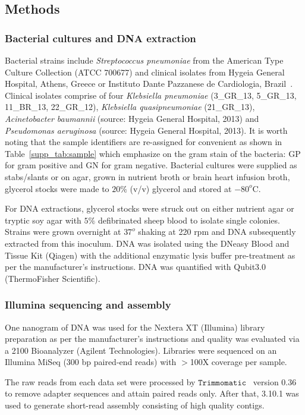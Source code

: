 \subsection{Methods}
\subsubsection{Bacterial cultures and DNA extraction}
Bacterial strains include \emph{Streptococcus pneumoniae} from the American Type Culture Collection (ATCC 700677) and clinical isolates from Hygeia General Hospital, Athens, Greece or Instituto Dante Pazzanese de Cardiologia, Brazil~\cite{Miranda2018}. Clinical isolates comprise of four \emph{Klebsiella pneumoniae} (3\_GR\_13, 5\_GR\_13, 11\_BR\_13, 22\_GR\_12), \emph{Klebsiella quasipneumoniae} (21\_GR\_13), \emph{Acinetobacter baumannii} (source: Hygeia General Hospital, 2013) and \emph{Pseudomonas aeruginosa} (source: Hygeia General Hospital, 2013). It is worth noting that the sample identifiers are re-assigned for convenient as shown in Table~\ref{supp_tab:sample} which emphasize on the gram stain of the bacteria: GP for gram positive and GN for gram negative.
Bacterial cultures were supplied as stabs/slants or on agar, grown in nutrient broth or brain heart infusion broth, glycerol stocks were made to $20 \%$ (v/v) glycerol and stored at $−80^o$C.

For DNA extractions, glycerol stocks were struck out on either nutrient agar or tryptic soy agar with $5\%$ defibrinated sheep blood to isolate single colonies. Strains were grown overnight at $37^o$ shaking at 220 rpm and DNA subsequently extracted from this inoculum. DNA was isolated using the DNeasy Blood and Tissue Kit (Qiagen) with the additional enzymatic lysis buffer pre-treatment as per the manufacturer’s instructions. DNA was quantified with Qubit3.0 (ThermoFisher Scientific).
\subsubsection{Illumina sequencing and assembly}
One nanogram of DNA was used for the Nextera XT (Illumina) library preparation as per the manufacturer’s instructions and quality was evaluated via a 2100 Bioanalyzer (Agilent Technologies). Libraries were sequenced on an Illumina MiSeq (300 bp paired-end reads) with $>$100X coverage per sample.

The raw reads from each data set were processed by  $\mathtt{Trimmomatic}$~\cite{BolgerLU2014} version 0.36 to remove adapter sequences and attain paired reads only. After that, \spades{} 3.10.1 was used to generate short-read assembly consisting of high quality contigs.
